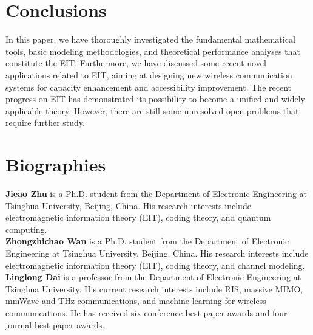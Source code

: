 \documentclass[journal,twocolumn]{IEEEtran}
\begin{document}
\section{Conclusions}
In this paper, we have thoroughly investigated the fundamental mathematical tools, basic modeling methodologies, and theoretical performance analyses that constitute the EIT. 
Furthermore, we have discussed some recent novel applications related to EIT, aiming at designing new wireless communication systems for capacity enhancement and accessibility improvement. 
The recent progress on EIT has demonstrated its possibility to become a unified and widely applicable theory. However, there are still some unresolved open problems that require further study. 


\footnotesize




\normalsize
\section*{Biographies}

{\bf Jieao Zhu} is a Ph.D. student from the Department of Electronic Engineering at Tsinghua University, Beijing, China. His research interests include electromagnetic information theory (EIT), coding theory, and quantum computing. 
\\

{\bf Zhongzhichao Wan} is a Ph.D. student from the Department of Electronic Engineering at Tsinghua University, Beijing, China. His research interests include electromagnetic information theory (EIT), coding theory, and channel modeling. 
\\


{\bf Linglong Dai} is a professor from the Department of Electronic Engineering at Tsinghua University. His current research interests include RIS, massive MIMO, mmWave and THz communications, and machine learning for wireless communications. He has received six conference best paper awards and four journal best paper awards.  
\end{document}
